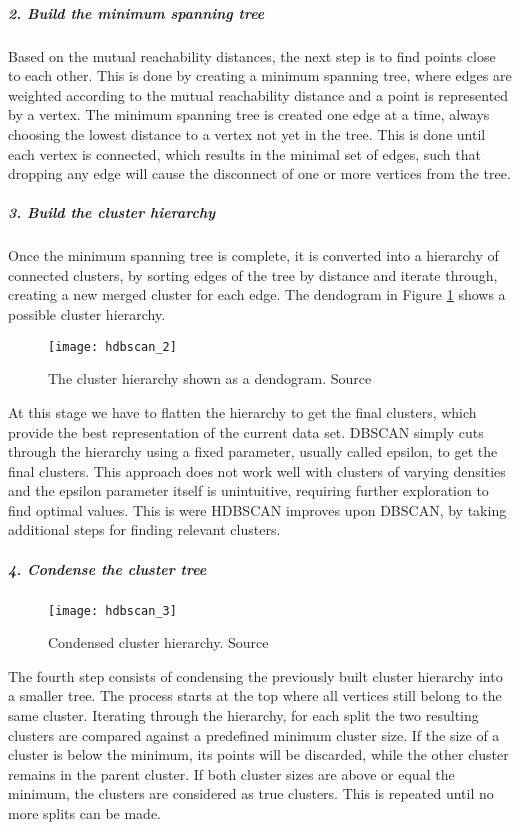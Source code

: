 \subparagraph{2. Build the minimum spanning tree}

Based on the mutual reachability distances, the next step is to find points close  to each other.
This is done by creating a minimum spanning tree,
where edges are weighted according to the mutual reachability distance and a point is represented by a vertex.
The minimum spanning tree is created one edge at a time, always choosing the lowest distance to a vertex not yet in the tree.
This is done until each vertex is connected, which results in the minimal set of edges,
such that dropping any edge will cause the disconnect of one or more vertices from the tree.

\subparagraph{3. Build the cluster hierarchy}

Once the minimum spanning tree is complete, it is converted into a hierarchy of connected clusters,
by sorting edges of the tree by distance and iterate through, creating a new merged cluster for each edge.
The dendogram in Figure \ref{fig:hdbscan_2} shows a possible cluster hierarchy. %

\begin{figure}[h]
    \centering
    \texttt{[image: hdbscan\_2]}
    \caption{The cluster hierarchy shown as a dendogram. Source\cite{how_hdbscan_works}}
    \label{fig:hdbscan_2}
\end{figure}

At this stage we have to flatten the hierarchy to get the final clusters, which provide the best representation of the current data set.
DBSCAN simply cuts through the hierarchy using a fixed parameter, usually called epsilon, to get the final clusters.
This approach does not work well with clusters of varying densities and the epsilon parameter itself is unintuitive,
requiring further exploration to find optimal values.
This is were HDBSCAN improves upon DBSCAN, by taking additional steps for finding relevant clusters.

\subparagraph{4. Condense the cluster tree}

\begin{figure}[h]
    \centering
    \texttt{[image: hdbscan\_3]}
    \caption{Condensed cluster hierarchy. Source\cite{how_hdbscan_works}}
    \label{fig:hdbscan_3}
\end{figure}

The fourth step consists of condensing the previously built cluster hierarchy into a smaller tree.
The process starts at the top where all vertices still belong to the same cluster.
Iterating through the hierarchy, for each split the two resulting clusters are compared against a predefined minimum cluster size.
If the size of a cluster is below the minimum, its points will be discarded, while the other cluster remains in the parent cluster.
If both cluster sizes are above or equal the minimum, the clusters are considered as true clusters.
This is repeated until no more splits can be made.

